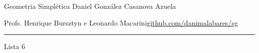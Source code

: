 
\usepackage[style=authortitle-terse,backend=bibtex]{biblatex}




\begin{minipage}{\textwidth}
	\begin{minipage}{1\textwidth}
		Geometria Simpl\'etica \hfill Daniel González Casanova Azuela
		
		{\small Profs. Henrique Bursztyn e Leonardo Macarini\hfill\href{https://github.com/danimalabares/sg}{github.com/danimalabares/sg}}
	\end{minipage}
\end{minipage}\vspace{.2cm}\hrule

\vspace{10pt}
{\huge Lista 6}

\tableofcontents

